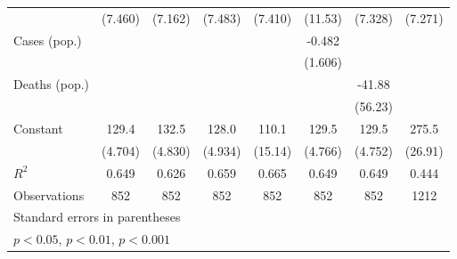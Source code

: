 \documentclass{article}
\begin{document}
{\begin{longtable}{l*{7}{c}}
                &  (7.460)         &  (7.162)         &  (7.483)         &  (7.410)         &  (11.53)         &  (7.328)         &  (7.271)         \\
Cases (pop.)    &                  &                  &                  &                  &   -0.482         &                  &                  \\
                &                  &                  &                  &                  &  (1.606)         &                  &                  \\
Deaths (pop.)   &                  &                  &                  &                  &                  &   -41.88         &                  \\
                &                  &                  &                  &                  &                  &  (56.23)         &                  \\
Constant        &    129.4\sym{***}&    132.5\sym{***}&    128.0\sym{***}&    110.1\sym{***}&    129.5\sym{***}&    129.5\sym{***}&    275.5\sym{***}\\
                &  (4.704)         &  (4.830)         &  (4.934)         &  (15.14)         &  (4.766)         &  (4.752)         &  (26.91)         \\
\hline
\(R^{2}\)       &    0.649         &    0.626         &    0.659         &    0.665         &    0.649         &    0.649         &    0.444         \\
Observations    &      852         &      852         &      852         &      852         &      852         &      852         &     1212         \\
\hline\hline
\multicolumn{8}{l}{\footnotesize Standard errors in parentheses}\\
\multicolumn{8}{l}{\footnotesize \sym{*} \(p<0.05\), \sym{**} \(p<0.01\), \sym{***} \(p<0.001\)}\\
\end{longtable}
}
\end{document}

